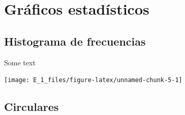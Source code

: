 \documentclass[10pt,]{krantz}
\newenvironment{Shaded}{\begin{snugshade}}{\end{snugshade}}
\newcommand{\DataTypeTok}[1]{\textcolor[rgb]{0.13,0.29,0.53}{#1}}
\newcommand{\DecValTok}[1]{\textcolor[rgb]{0.00,0.00,0.81}{#1}}
\newcommand{\KeywordTok}[1]{\textcolor[rgb]{0.13,0.29,0.53}{\textbf{#1}}}
\newcommand{\NormalTok}[1]{#1}
\newcommand{\OperatorTok}[1]{\textcolor[rgb]{0.81,0.36,0.00}{\textbf{#1}}}
\newcommand{\StringTok}[1]{\textcolor[rgb]{0.31,0.60,0.02}{#1}}
\theoremstyle{definition}
\theoremstyle{definition}
\theoremstyle{definition}
\theoremstyle{definition}
\theoremstyle{remark}
\begin{document}
\hypertarget{gruxe1ficos-estaduxedsticos}{%
\chapter{Gráficos estadísticos}\label{gruxe1ficos-estaduxedsticos}}

\hypertarget{histograma-de-frecuencias}{%
\section{Histograma de frecuencias}\label{histograma-de-frecuencias}}

\begin{Shaded}
\end{Shaded}

Some text

\begin{Shaded}
\end{Shaded}

\begin{center}\texttt{[image: E\_1\_files/figure-latex/unnamed-chunk-5-1]} \end{center}

\hypertarget{circulares}{%
\section{Circulares}\label{circulares}}
\end{document}
